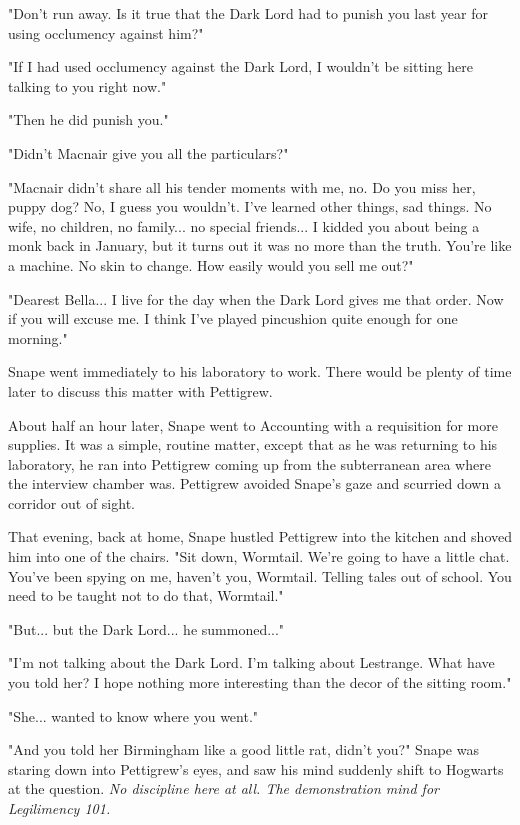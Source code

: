\documentclass[a4paper,11pt]{article}
\begin{document}
"Don't run away. Is it true that the Dark Lord had to punish you last year for using occlumency against him?"

"If I had used occlumency against the Dark Lord, I wouldn't be sitting here talking to you right now."

"Then he did punish you."

"Didn't Macnair give you all the particulars?"

"Macnair didn't share all his tender moments with me, no. Do you miss her, puppy dog? No, I guess you wouldn't. I've learned other things, sad things. No wife, no children, no family... no special friends... I kidded you about being a monk back in January, but it turns out it was no more than the truth. You're like a machine. No skin to change. How easily would you sell me out?"

"Dearest Bella... I live for the day when the Dark Lord gives me that order. Now if you will excuse me. I think I've played pincushion quite enough for one morning."

Snape went immediately to his laboratory to work. There would be plenty of time later to discuss this matter with Pettigrew.

About half an hour later, Snape went to Accounting with a requisition for more supplies. It was a simple, routine matter, except that as he was returning to his laboratory, he ran into Pettigrew coming up from the subterranean area where the interview chamber was. Pettigrew avoided Snape's gaze and scurried down a corridor out of sight.

That evening, back at home, Snape hustled Pettigrew into the kitchen and shoved him into one of the chairs. "Sit down, Wormtail. We're going to have a little chat. You've been spying on me, haven't you, Wormtail. Telling tales out of school. You need to be taught not to do that, Wormtail."

"But... but the Dark Lord... he summoned..."

"I'm not talking about the Dark Lord. I'm talking about Lestrange. What have you told her? I hope nothing more interesting than the decor of the sitting room."

"She... wanted to know where you went."

"And you told her Birmingham like a good little rat, didn't you?" Snape was staring down into Pettigrew's eyes, and saw his mind suddenly shift to Hogwarts at the question. \emph{No discipline here at all. The demonstration mind for Legilimency 101.}
\end{document}
